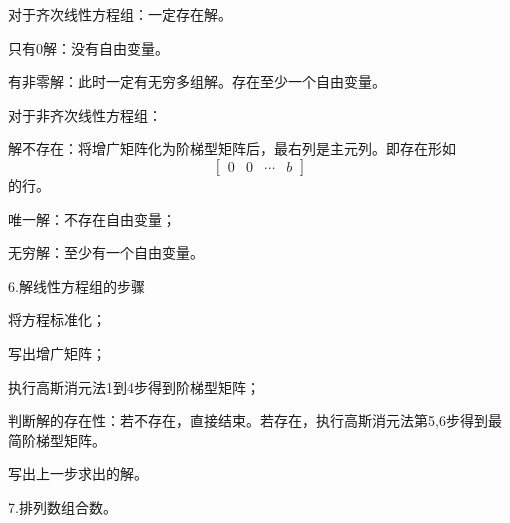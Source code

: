 \documentclass{article}
\begin{document}
对于齐次线性方程组：一定存在解。
\begin{asparaenum}[(1)]
\item 只有0解：没有自由变量。
\item 有非零解：此时一定有无穷多组解。存在至少一个自由变量。
\end{asparaenum}

对于非齐次线性方程组：
\begin{asparaenum}[(1)]
\item 解不存在：将增广矩阵化为阶梯型矩阵后，最右列是主元列。即存在形如
    \begin{equation*}
      \begin{bmatrix}
        0& 0& \cdots&b
      \end{bmatrix}
    \end{equation*}
的行。
\item 唯一解：不存在自由变量；

\item 无穷解：至少有一个自由变量。
\end{asparaenum}

6.\textcolor[rgb]{1.00,0.00,0.00}{解线性方程组的步骤}
\begin{asparaenum}[(1)]
\item 将方程标准化；
\item 写出增广矩阵；
\item 执行高斯消元法1到4步得到阶梯型矩阵；
\item 判断解的存在性：若不存在，直接结束。若存在，执行高斯消元法第5,6步得到最简阶梯型矩阵。
\item  写出上一步求出的解。
\end{asparaenum}

%
7.排列数组合数。
\end{document}
